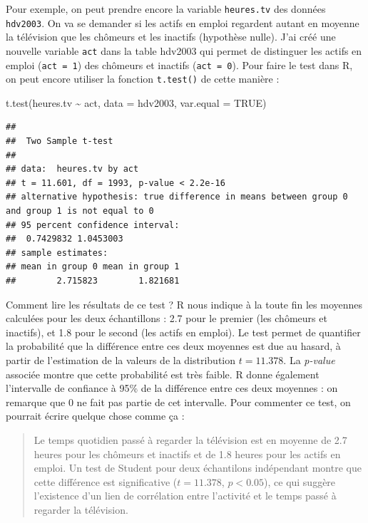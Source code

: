 \documentclass[
]{book}
\newenvironment{Shaded}{\begin{snugshade}}{\end{snugshade}}
\newcommand{\AttributeTok}[1]{\textcolor[rgb]{0.77,0.63,0.00}{#1}}
\newcommand{\ConstantTok}[1]{\textcolor[rgb]{0.00,0.00,0.00}{#1}}
\newcommand{\FunctionTok}[1]{\textcolor[rgb]{0.00,0.00,0.00}{#1}}
\newcommand{\NormalTok}[1]{#1}
\newcommand{\SpecialCharTok}[1]{\textcolor[rgb]{0.00,0.00,0.00}{#1}}
\begin{document}
Pour exemple, on peut prendre encore la variable \texttt{heures.tv} des données \texttt{hdv2003}. On va se demander si les actifs en emploi regardent autant en moyenne la télévision que les chômeurs et les inactifs (hypothèse nulle). J'ai créé une nouvelle variable \texttt{act} dans la table hdv2003 qui permet de distinguer les actifs en emploi (\texttt{act\ =\ 1}) des chômeurs et inactifs (\texttt{act\ =\ 0}). Pour faire le test dans R, on peut encore utiliser la fonction \texttt{t.test()} de cette manière :

\begin{Shaded}
\begin{Highlighting}[]
\FunctionTok{t.test}\NormalTok{(heures.tv }\SpecialCharTok{\textasciitilde{}}\NormalTok{ act, }\AttributeTok{data =}\NormalTok{ hdv2003, }\AttributeTok{var.equal =} \ConstantTok{TRUE}\NormalTok{)}
\end{Highlighting}
\end{Shaded}

\begin{verbatim}
## 
##  Two Sample t-test
## 
## data:  heures.tv by act
## t = 11.601, df = 1993, p-value < 2.2e-16
## alternative hypothesis: true difference in means between group 0 and group 1 is not equal to 0
## 95 percent confidence interval:
##  0.7429832 1.0453003
## sample estimates:
## mean in group 0 mean in group 1 
##        2.715823        1.821681
\end{verbatim}

Comment lire les résultats de ce test ? R nous indique à la toute fin les moyennes calculées pour les deux échantillons : 2.7 pour le premier (les chômeurs et inactifs), et 1.8 pour le second (les actifs en emploi). Le test permet de quantifier la probabilité que la différence entre ces deux moyennes est due au hasard, à partir de l'estimation de la valeurs de la distribution \(t = 11.378\). La \emph{p-value} associée montre que cette probabilité est très faible. R donne également l'intervalle de confiance à 95\% de la différence entre ces deux moyennes : on remarque que 0 ne fait pas partie de cet intervalle. Pour commenter ce test, on pourrait écrire quelque chose comme ça :

\begin{quote}
Le temps quotidien passé à regarder la télévision est en moyenne de 2.7 heures pour les chômeurs et inactifs et de 1.8 heures pour les actifs en emploi. Un test de Student pour deux échantilons indépendant montre que cette différence est significative (\(t = 11.378\), \(p < 0.05\)), ce qui suggère l'existence d'un lien de corrélation entre l'activité et le temps passé à regarder la télévision.
\end{quote}
\end{document}
